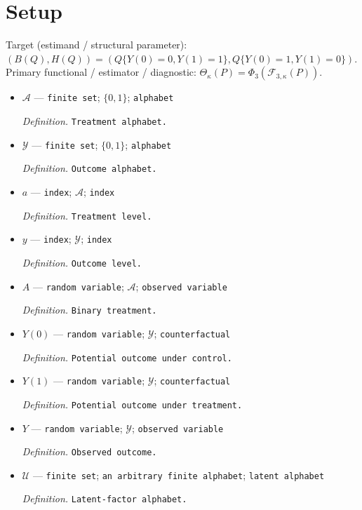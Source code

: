 \documentclass{article}
\begin{document}
\section{Setup}

Target (estimand / structural parameter): \((B(Q),H(Q))=(Q\{Y(0)=0,Y(1)=1\},Q\{Y(0)=1,Y(1)=0\})\).
Primary functional / estimator / diagnostic: \(\Theta_\kappa(P)=\Phi_3(\mathcal F_{3,\kappa}(P))\).
\begin{itemize}
  \item \(\mathcal A\) --- \texttt{finite set}; \(\{0,1\}\); \texttt{alphabet}
  \par\smallskip\noindent\emph{Definition.} \texttt{Treatment alphabet.}
  \item \(\mathcal Y\) --- \texttt{finite set}; \(\{0,1\}\); \texttt{alphabet}
  \par\smallskip\noindent\emph{Definition.} \texttt{Outcome alphabet.}
  \item \(a\) --- \texttt{index}; \(\mathcal A\); \texttt{index}
  \par\smallskip\noindent\emph{Definition.} \texttt{Treatment level.}
  \item \(y\) --- \texttt{index}; \(\mathcal Y\); \texttt{index}
  \par\smallskip\noindent\emph{Definition.} \texttt{Outcome level.}
  \item \(A\) --- \texttt{random variable}; \(\mathcal A\); \texttt{observed variable}
  \par\smallskip\noindent\emph{Definition.} \texttt{Binary treatment.}
  \item \(Y(0)\) --- \texttt{random variable}; \(\mathcal Y\); \texttt{counterfactual}
  \par\smallskip\noindent\emph{Definition.} \texttt{Potential outcome under control.}
  \item \(Y(1)\) --- \texttt{random variable}; \(\mathcal Y\); \texttt{counterfactual}
  \par\smallskip\noindent\emph{Definition.} \texttt{Potential outcome under treatment.}
  \item \(Y\) --- \texttt{random variable}; \(\mathcal Y\); \texttt{observed variable}
  \par\smallskip\noindent\emph{Definition.} \texttt{Observed outcome.}
  \item \(\mathcal U\) --- \texttt{finite set}; \texttt{an arbitrary finite alphabet}; \texttt{latent alphabet}
  \par\smallskip\noindent\emph{Definition.} \texttt{Latent-\allowbreak{}factor alphabet.}

\end{itemize}
\end{document}
